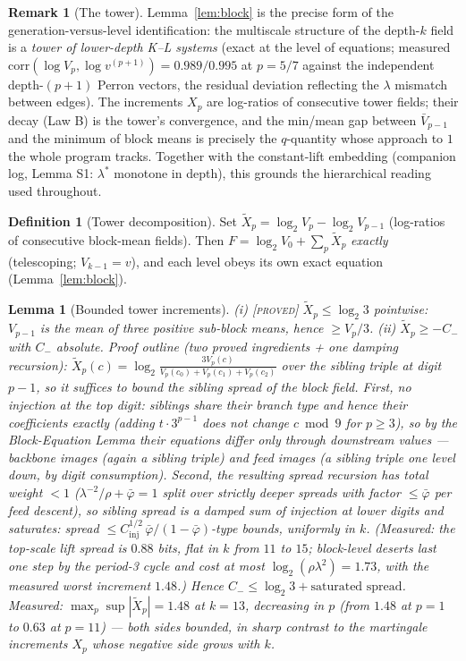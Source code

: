 \documentclass[11pt]{article}
\newtheorem{lemma}[theorem]{Lemma}
\theoremstyle{definition}
\newtheorem{definition}[theorem]{Definition}
\newtheorem{remark}[theorem]{Remark}
\newcommand{\PROVED}{\textup{[\textsc{proved}]}}
\newcommand{\lam}{\lambda}
\newcommand{\pbar}{\bar\varphi}
\begin{document}
\begin{remark}[The tower]\label{rem:tower}
Lemma~\ref{lem:block} is the precise form of the generation-versus-level
identification: the multiscale structure of the depth-$k$ field is a
\emph{tower of lower-depth K--L systems} (exact at the level of equations;
measured $\mathrm{corr}(\log V_p, \log v^{(p+1)}) = 0.989/0.995$ at
$p = 5/7$ against the independent depth-$(p{+}1)$ Perron vectors, the
residual deviation reflecting the $\lam$ mismatch between edges). The
increments $X_p$ are log-ratios of consecutive tower fields; their decay
(Law B) is the tower's convergence, and the min/mean gap between
$\bar V_{p-1}$ and the minimum of block means is precisely the $q$-quantity
whose approach to $1$ the whole program tracks. Together with the
constant-lift embedding (companion log, Lemma S1: $\lam^*$ monotone in
depth), this grounds the hierarchical reading used throughout.
\end{remark}

\begin{definition}[Tower decomposition]\label{def:tower}
Set $\tilde X_p = \log_2 V_p - \log_2 V_{p-1}$ (log-ratios of consecutive
block-mean fields). Then $F = \log_2 V_0 + \sum_{p} \tilde X_p$ \emph{exactly}
(telescoping; $V_{k-1} = v$), and each level obeys its own exact equation
(Lemma~\ref{lem:block}).
\end{definition}

\begin{lemma}[Bounded tower increments]\label{lem:pos}
(i) \PROVED{} $\tilde X_p \le \log_2 3$ pointwise: $V_{p-1}$ is the mean of
three positive sub-block means, hence $\ge V_p/3$.
(ii) $\tilde X_p \ge -C_-$ with $C_-$ absolute. \emph{Proof outline
(two proved ingredients + one damping recursion):}
$\tilde X_p(c) = \log_2 \frac{3 V_p(c)}{V_p(c_0)+V_p(c_1)+V_p(c_2)}$ over
the sibling triple at digit $p{-}1$, so it suffices to bound the sibling
spread of the block field. First, \emph{no injection at the top digit}:
siblings share their branch type and hence their coefficients exactly
(adding $t\cdot 3^{p-1}$ does not change $c \bmod 9$ for $p \ge 3$), so by
the Block-Equation Lemma their equations differ only through downstream
values --- backbone images (again a sibling triple) and feed images (a
sibling triple one level down, by digit consumption). Second, the
resulting spread recursion has total weight $< 1$
($\lam^{-2}/\rho + \pbar = 1$ split over strictly deeper spreads with
factor $\le \pbar$ per feed descent), so sibling spread is a damped sum of
injection at lower digits and \emph{saturates}: spread
$\le C_{\mathrm{inj}}^{1/2}\,\pbar/(1-\pbar)$-type bounds, uniformly in
$k$. (Measured: the top-scale lift spread is $0.88$ bits, flat in $k$ from
$11$ to $15$; block-level deserts last one step by the period-3 cycle and
cost at most $\log_2(\rho\lam^2) = 1.73$, with the measured worst
increment $1.48$.) Hence $C_- \le \log_2 3 + \text{saturated spread}$.
\emph{Measured:} $\max_p \sup |\tilde X_p| = 1.48$ at $k=13$, decreasing
in $p$ (from $1.48$ at $p{=}1$ to $0.63$ at $p{=}11$) --- both sides
bounded, in sharp contrast to the martingale increments $X_p$ whose
negative side grows with $k$.
\end{lemma}
\end{document}

